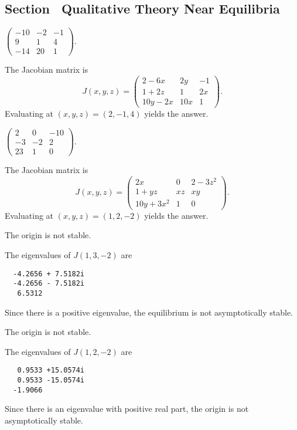 \documentclass{ximera}
\begin{document}
\subsection*{Section~\protect{\ref{S:QT}} Qualitative Theory Near Equilibria}


 \ans $\left(\begin{array}{rrr}
-10 & -2 & -1\\ 9 & 1 & 4 \\ -14 & 20 & 1\end{array}\right)$.

\vspace{0.08in}

\soln  The Jacobian matrix is
\[
J(x,y,z) = \left(\begin{array}{ccc}
2 - 6x & 2y & -1\\ 1+2z & 1 & 2x\\ 10y-2x & 10x & 1\end{array}\right).
\]
Evaluating at $(x,y,z)=(2,-1,4)$ yields the answer.

 \ans $\left(\begin{array}{rrr}
2 & 0 & -10\\ -3 & -2 & 2 \\ 23 & 1 & 0 \end{array}\right)$.

\vspace{0.08in}

\soln  The Jacobian matrix is
\[
J(x,y,z) = \left(\begin{array}{ccc}
2x & 0 & 2-3z^2\\ 1+yz & xz & xy\\ 10y+3x^2 & 1 & 0 \end{array}\right).
\]
Evaluating at $(x,y,z)=(1,2,-2)$ yields the answer.


 \ans The origin is not stable.

\soln The eigenvalues of $J(1,3,-2)$ are
\begin{verbatim}
  -4.2656 + 7.5182i
  -4.2656 - 7.5182i
   6.5312          
\end{verbatim}
Since there is a positive eigenvalue, the equilibrium is not 
asymptotically stable.


 \ans The origin is not stable.

\soln The eigenvalues of $J(1,2,-2)$ are
\begin{verbatim}
   0.9533 +15.0574i
   0.9533 -15.0574i
  -1.9066    
\end{verbatim}
Since there is an eigenvalue with positive real part, the origin is not 
asymptotically stable.
\end{document}
